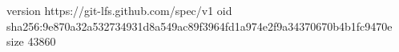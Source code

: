version https://git-lfs.github.com/spec/v1
oid sha256:9e870a32a532734931d8a549ac89f3964fd1a974e2f9a34370670b4b1fc9470e
size 43860
